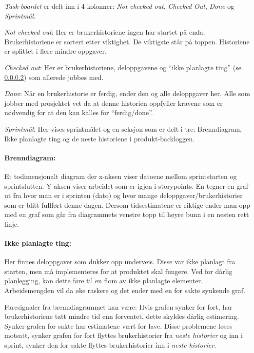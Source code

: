 \documentclass[12pt,a4paper,norsk]{article}
\begin{document}
    \textit{Task-boardet} er delt inn i 4 kolonner: \textit{Not checked out}, \textit{Checked Out}, \textit{Done} og \textit{Sprintmål}.

    \textit{Not checked out}: Her er brukerhistoriene ingen har startet på enda. Brukerhistoriene er sortert etter viktighet. De viktigste står på toppen. Historiene er splittet i flere mindre oppgaver.

    \textit{Checked out}: Her er brukerhistoriene, deloppgavene og “ikke planlagte ting” (se \ref{subsec:ikkeplanlagt}) som allerede jobbes med.

    \textit{Done}: Når en brukerhistorie er ferdig, ender den og alle deloppgaver her. Alle som jobber med prosjektet vet da at denne historien oppfyller kravene som er nødvendig for at den kan kalles for “ferdig/done”.

    \textit{Sprintmål}: Her vises sprintmålet og en seksjon som er delt i tre: Brenndiagram, Ikke planlagte ting og de neste historiene i produkt-backloggen.

    \paragraph{Brenndiagram:}
    Et todimensjonalt diagram der x-aksen viser datoene mellom sprintstarten og sprintslutten. Y-aksen viser arbeidet som er igjen i storypoints. En tegner en graf ut fra hvor man er i sprinten (dato) og hvor mange deloppgaver/brukerhistorier som er blitt fullført denne dagen. Dersom tidsestimatene er riktige ender man opp med en graf som går fra diagrammets venstre topp til høyre bunn i en nesten rett linje.

    \paragraph{Ikke planlagte ting:}\label{subsec:ikkeplanlagt}
    Her finnes deloppgaver som dukker opp underveis. Disse var ikke planlagt fra starten, men må implementeres for at produktet skal fungere. Ved for dårlig planlegging, kan dette føre til en flom av ikke planlagte elementer. Arbeidsmengden vil da øke raskere og det ender med en for sakte synkende graf.

    Faresignaler fra brenndiagrammet kan være: Hvis grafen synker for fort, har brukerhistoriene tatt mindre tid enn forventet, dette skyldes dårlig estimering. Synker grafen for sakte har estimatene vært for lave. Disse problemene løses motsatt, synker grafen for fort flyttes brukerhistorier fra \textit{neste historier} og inn i sprint, synker den for sakte flyttes brukerhistorier inn i \textit{neste historier}.
\end{document}
